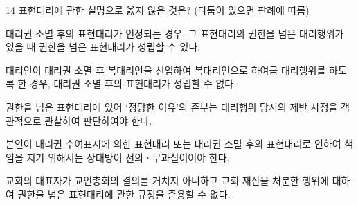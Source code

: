 \begin{question}{14}
표현대리에 관한 설명으로 옳지 않은 것은? (다툼이 있으면 판례에 따름)
\begin{choices}
  \item 대리권 소멸 후의 표현대리가 인정되는 경우, 그 표현대리의 권한을 넘은 대리행위가 있을 때 권한을 넘은 표현대리가 성립할 수 있다.
  \item 대리인이 대리권 소멸 후 복대리인을 선임하여 복대리인으로 하여금 대리행위를 하도록 한 경우, 대리권 소멸 후의 표현대리가 성립할 수 없다.
  \item 권한을 넘은 표현대리에 있어 ‘정당한 이유’의 존부는 대리행위 당시의 제반 사정을 객관적으로 관찰하여 판단하여야 한다.
  \item 본인이 대리권 수여표시에 의한 표현대리 또는 대리권 소멸 후의 표현대리로 인하여 책임을 지기 위해서는 상대방이 선의ㆍ무과실이어야 한다.
  \item 교회의 대표자가 교인총회의 결의를 거치지 아니하고 교회 재산을 처분한 행위에 대하여 권한을 넘은 표현대리에 관한 규정을 준용할 수 없다.
\end{choices}
\end{question}
